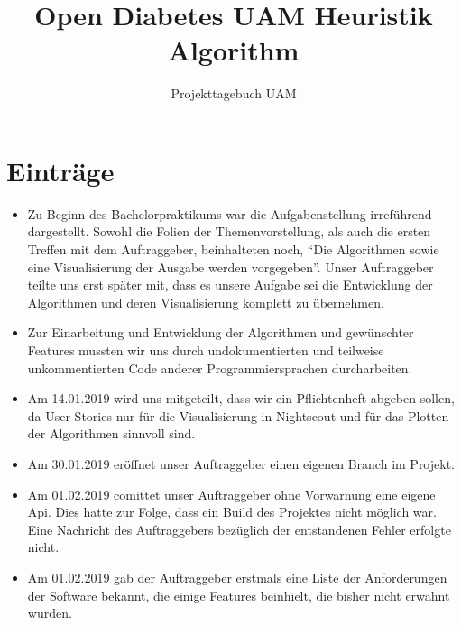 \documentclass[accentcolor=tud0b,12pt,paper=a4]{tudreport}
\title{Open Diabetes UAM Heuristik Algorithm}
\subtitle{Projekttagebuch UAM}
\begin{document}
	\maketitle
		
	\newpage
	\chapter*{Einträge}
	
	
	\begin{itemize}
	
\item Zu Beginn des Bachelorpraktikums war die Aufgabenstellung irreführend dargestellt. Sowohl die Folien der Themenvorstellung, als auch die ersten Treffen mit dem Auftraggeber, beinhalteten noch, “Die Algorithmen sowie eine Visualisierung der Ausgabe werden vorgegeben”. Unser Auftraggeber teilte uns erst später mit, dass es unsere Aufgabe sei die Entwicklung der Algorithmen und deren Visualisierung komplett zu übernehmen.

\item Zur Einarbeitung und Entwicklung der Algorithmen und gewünschter Features mussten wir uns durch undokumentierten und teilweise unkommentierten Code anderer Programmiersprachen durcharbeiten.

\item Am 14.01.2019 wird uns mitgeteilt, dass wir ein Pflichtenheft abgeben sollen, da User Stories nur für die Visualisierung in Nightscout und für das Plotten der Algorithmen sinnvoll sind.

\item Am 30.01.2019 eröffnet unser Auftraggeber einen eigenen Branch im Projekt.

\item Am 01.02.2019 comittet unser Auftraggeber ohne Vorwarnung eine eigene Api. Dies hatte zur Folge, dass ein Build des Projektes nicht möglich war. Eine Nachricht des Auftraggebers bezüglich der entstandenen Fehler erfolgte nicht.

\item Am 01.02.2019 gab der Auftraggeber erstmals eine Liste der Anforderungen der Software bekannt, die einige Features beinhielt, die bisher nicht erwähnt wurden.

	
	\end{itemize}		

	
	
	
\end{document}
